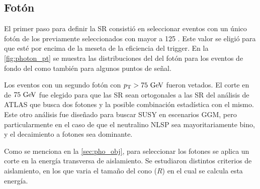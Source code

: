 

\subsection{Fotón}\label{sec:opt_ph_iso}

El primer paso para definir la SR consistió en seleccionar eventos con un único
fotón de los previamente seleccionados con {\pt} mayor a 125 \gev. Este valor se
eligió para que esté por encima de la meseta de la eficiencia del trigger. En la
\cref{fig:photon_pt} se muestra las distribuciones del {\pt} del fotón para los
eventos de fondo del {\SM} como también para algunos puntos de señal.

Los eventos con un segundo fotón con $\pt > 75 \gev$ fueron vetados. El corte en {\pt}
 de $75\gev$ fue elegido para que las SR sean ortogonales a las SR del análisis de ATLAS
que busca dos fotones\cite{ATLAS-CONF-2014-001}
y la posible combinación estadística con el mismo. Este otro análisis fue diseñado
para buscar SUSY en escenarios GGM, pero particularmente en el caso de que el
neutralino NLSP sea mayoritariamente bino, y el decaimiento a fotones sea
dominante.



Como se menciona en la \cref{sec:pho_obj}, para seleccionar los fotones se
aplica un corte en la energía transversa de aislamiento. Se estudiaron distintos
criterios de aislamiento, en los que varia el tamaño del cono ($R$) en el cual se
calcula esta energía.


